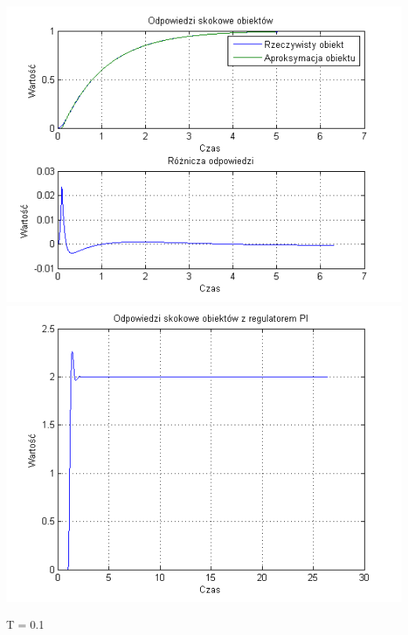 \documentclass[10pt,a4paper]{article}
\begin{document}
\begin{center}
\includegraphics[scale=1]{images/jeden/skrypt_91.png}\\
\includegraphics[scale=1]{images/jeden/skrypt_92.png}\\
\end{center}
\newpage
T = 0.1
\end{document}
